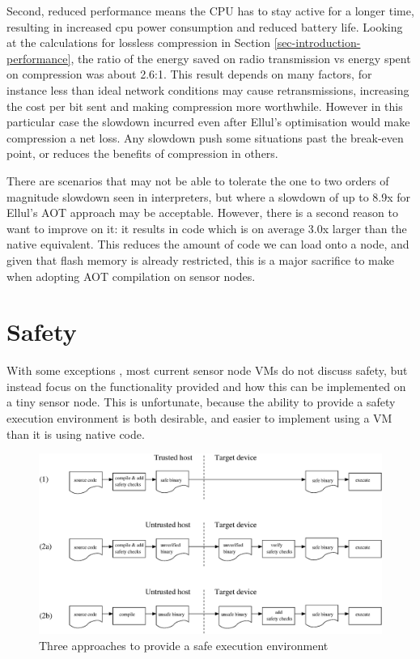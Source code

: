 Second, reduced performance means the CPU has to stay active for a longer time, resulting in increased cpu power consumption and reduced battery life. Looking at the calculations for lossless compression in Section \ref{sec-introduction-performance}, the ratio of the energy saved on radio transmission vs energy spent on compression was about 2.6:1. This result depends on many factors, for instance less than ideal network conditions may cause retransmissions, increasing the cost per bit sent and making compression more worthwhile. However in this particular case the slowdown incurred even after Ellul's optimisation would make compression a net loss. Any slowdown push some situations past the break-even point, or reduces the benefits of compression in others.

There are scenarios that may not be able to tolerate the one to two orders of magnitude slowdown seen in interpreters, but where a slowdown of up to 8.9x for Ellul's AOT approach may be acceptable. However, there is a second reason to want to improve on it: it results in code which is on average 3.0x larger than the native equivalent. This reduces the amount of code we can load onto a node, and given that flash memory is already restricted, this is a major sacrifice to make when adopting AOT compilation on sensor nodes.


\section{Safety}
\label{sec-state-of-the-art-safety}
With some exceptions \cite{Evers:2010ur}, most current sensor node VMs do not discuss safety, but instead focus on the functionality provided and how this can be implemented on a tiny sensor node. This is unfortunate, because the ability to provide a safety execution environment is both desirable, and easier to implement using a VM than it is using native code.

\begin{figure}
\centering
\includegraphics[width=\linewidth]{safe-compilation-process.eps}
\caption{Three approaches to provide a safe execution environment}
\label{fig-safe-compilation-process}
\end{figure}

